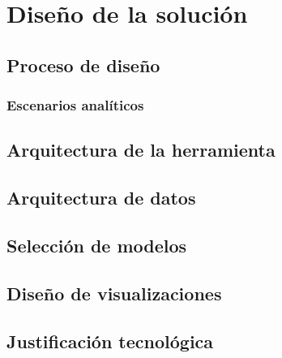 \chapter{Diseño de la solución}
\label{chapter:design}

\section{Proceso de diseño}
\label{chapter:proceso-diseño}

\subsection{Escenarios analíticos}

\section{Arquitectura de la herramienta}
\label{section:arquitectura}

\section{Arquitectura de datos}
\label{section:arquitectura-datos}

\section{Selección de modelos}
\label{section:seleccion-modelos}

\section{Diseño de visualizaciones}
\label{section:diseño-viz}

\section{Justificación tecnológica}
\label{section:justificacion-tecnologica}

